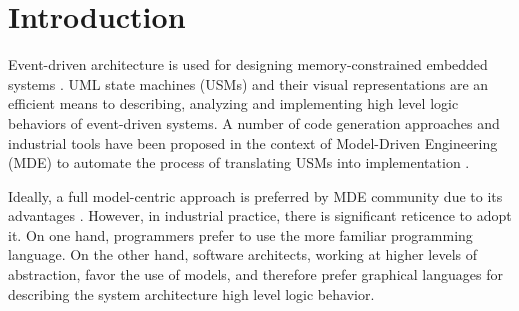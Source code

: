 \section{Introduction}
\label{sec:intro}



Event-driven architecture is used for designing memory-constrained embedded systems \cite{Dunkels:2006:PSE:1182807.1182811}. 
UML state machines (USMs) and their visual representations are an efficient means to describing, analyzing and implementing high level logic behaviors of event-driven systems. 
A number of code generation approaches and industrial tools have been proposed in the context of Model-Driven Engineering (MDE) \cite{kent2002model} to automate the process of translating USMs into implementation \cite{Booch1998, Douglass1999,Shalyto2006,Douglass1999, ibm_rhapsody, sinelabore, qm}.  

Ideally, a full model-centric approach is preferred by MDE community due to its advantages \cite{Selic2012}. 
However, in industrial practice, there is significant reticence \cite{Hutchinson:2011:MEP:1985793.1985882} to adopt it.
On one hand, programmers prefer to
use the more familiar programming language. 
On the other hand, software architects, working at higher levels
of abstraction, favor the use of models, and therefore
prefer graphical languages for describing the system architecture high level logic behavior.

